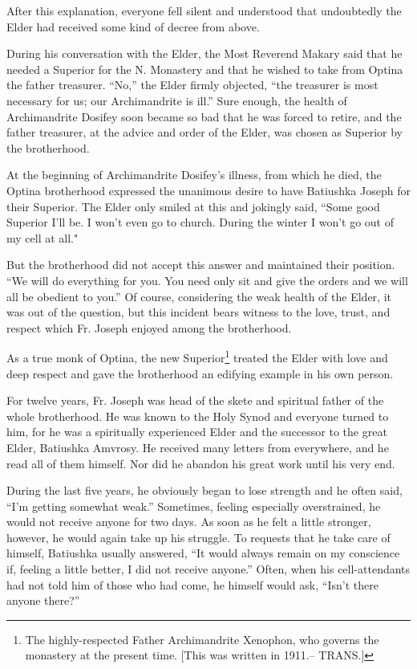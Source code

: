 After this explanation, everyone fell silent and understood that undoubtedly the Elder had received some kind of decree from above.

During his conversation with the Elder, the Most Reverend Makary said that he needed a Superior for the N. Monastery and that he wished to take from Optina the father treasurer. “No,” the Elder firmly objected, “the treasurer is most necessary for us; our Archimandrite is ill.” Sure enough, the health of Archimandrite Dosifey soon became so bad that he was forced to retire, and the father treasurer, at the advice and order of the Elder, was chosen as Superior by the brotherhood.

At the beginning of Archimandrite Dosifey's illness, from which he died, the Optina brotherhood expressed the unanimous desire to have Batiushka Joseph for their Superior. The Elder only smiled at this and jokingly said, “Some good Superior I'll be. I won't even go to church. During the winter I won't go out of my cell at all."

But the brotherhood did not accept this answer and maintained their position. “We will do everything for you. You need only sit and give the orders and we will all be obedient to you.” Of course, considering the weak health of the Elder, it was out of the question, but this incident bears witness to the love, trust, and respect which Fr. Joseph enjoyed among the brotherhood.

As a true monk of Optina, the new Superior\footnote{The highly-respected Father Archimandrite Xenophon, who governs the monastery at the present time. [This was written in 1911.\scriptsize -- TRANS.\footnotesize ]} treated the Elder with love and deep respect and gave the brotherhood an edifying example in his own person.

For twelve years, Fr. Joseph was head of the skete and spiritual father of the whole brotherhood. He was known to the Holy Synod and everyone turned to him, for he was a spiritually experienced Elder and the successor to the great Elder, Batiushka Amvrosy. He received many letters from everywhere, and he read all of them himself. Nor did he abandon his great work until his very end.

During the last five years, he obviously began to lose strength and he often said, “I'm getting somewhat weak.” Sometimes, feeling especially overstrained, he would not receive anyone for two days. As soon as he felt a little stronger, however, he would again take up his struggle. To requests that he take care of himself, Batiushka usually answered, “It would always remain on my conscience if, feeling a little better, I did not receive anyone.” Often, when his cell-attendants had not told him of those who had come, he himself would ask, “Isn't there anyone there?”

